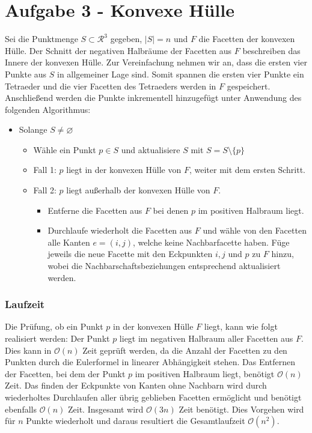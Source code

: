 \documentclass[a4paper]{article}
\begin{document}
\section*{Aufgabe 3 - Konvexe Hülle}

Sei die Punktmenge $S \subset \mathcal{R}^3$ gegeben, $|S| = n$ und $F$ die Facetten der konvexen Hülle. Der Schnitt der negativen Halbräume der Facetten aus $F$ beschreiben das Innere der konvexen Hülle. 
Zur Vereinfachung nehmen wir an, dass die ersten vier Punkte aus $S$ in allgemeiner Lage sind. Somit spannen die ersten vier Punkte ein Tetraeder und die vier Facetten des Tetraeders werden in $F$ gespeichert. Anschließend werden die Punkte inkrementell hinzugefügt unter Anwendung des folgenden Algorithmus:

\begin{itemize}
	\item Solange $S \neq \varnothing$
	\begin{itemize}	
		\item Wähle ein Punkt $p \in S$ und aktualisiere $S$ mit $S = S \setminus \{p\}$
		\item Fall 1: $p$ liegt in der konvexen Hülle von $F$, weiter mit dem ersten Schritt.
		\item Fall 2: $p$ liegt außerhalb der konvexen Hülle von $F$.
	\begin{itemize}
		\item Entferne die Facetten aus $F$ bei denen $p$ im positiven Halbraum liegt.
		\item Durchlaufe wiederholt die Facetten aus $F$ und wähle von den Facetten alle Kanten $ e = (i,j) $, welche keine Nachbarfacette haben.
		Füge jeweils die neue Facette mit den Eckpunkten $i,j$ und $p$ zu $F$ hinzu, wobei die Nachbarschaftsbeziehungen entsprechend aktualisiert werden. 
	\end{itemize}
	\end{itemize}
\end{itemize}


\subsubsection*{Laufzeit}

Die Prüfung, ob ein Punkt $p$ in der konvexen Hülle $F$ liegt, kann wie folgt realisiert werden: Der Punkt $p$ liegt im negativen Halbraum aller Facetten aus $F$. Dies kann in $\mathcal{O}(n)$ Zeit geprüft werden, da die Anzahl der Facetten zu den Punkten durch die Eulerformel in linearer Abhängigkeit stehen. Das Entfernen der Facetten, bei dem der Punkt $p$ im positiven Halbraum liegt, benötigt $\mathcal{O}(n)$ Zeit. Das finden der Eckpunkte von Kanten ohne Nachbarn wird durch wiederholtes Durchlaufen aller übrig geblieben Facetten ermöglicht und benötigt ebenfalls $\mathcal{O}(n)$ Zeit. Insgesamt wird $\mathcal{O}(3n)$ Zeit benötigt. Dies Vorgehen wird für $n$ Punkte wiederholt und daraus resultiert die Gesamtlaufzeit $\mathcal{O}(n^2)$.
\end{document}
